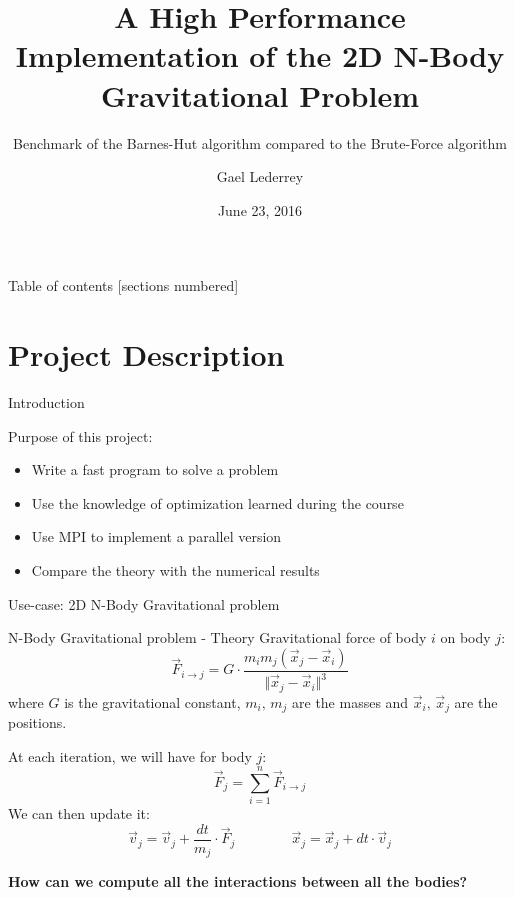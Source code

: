 \documentclass[10pt]{beamer}
\title{\vspace{1cm} A High Performance Implementation of the 2D N-Body Gravitational Problem}
\subtitle{Benchmark of the Barnes-Hut algorithm compared to the Brute-Force algorithm}
\date{June 23, 2016}
\author{Gael Lederrey}
\institute{Parallel and High-Performance Computing - Spring Semester 2016 \\ EPFL-CSE}
\begin{document}
\maketitle

\begin{frame}{Table of contents}
  [sections numbered]
  \tableofcontents[hideallsubsections]
\end{frame}

\section{Project Description}

\begin{frame}{Introduction}

Purpose of this project:
\begin{itemize}
\item Write a fast program to solve a problem
\item Use the knowledge of optimization learned during the course
\item Use MPI to implement a parallel version
\item Compare the theory with the numerical results
\end{itemize}
\vspace{0.5cm}
Use-case: 2D N-Body Gravitational problem

\end{frame}

\begin{frame}{N-Body Gravitational problem - Theory}
Gravitational force of body $i$ on body $j$:
\[
\vec{F}_{i\rightarrow j} = G\cdot\frac{m_im_j(\vec{x}_j-\vec{x}_i)}{\Vert \vec{x}_j-\vec{x}_i\Vert^3}
\]
where $G$ is the gravitational constant, $m_i,\,m_j$ are the masses and $\vec{x}_i,\,\vec{x}_j$ are the positions.

At each iteration, we will have for body $j$:
\[
\vec{F}_j = \sum_{i=1}^n \vec{F}_{i\rightarrow j}
\]
We can then update it:
\[
\vec{v}_j = \vec{v}_j + \dfrac{dt}{m_j}\cdot \vec{F}_j \qquad \qquad \vec{x}_j = \vec{x}_j + dt\cdot\vec{v}_j
\]

\begin{center}
{\bf  How can we compute all the interactions between all the bodies?}
\end{center}

\end{frame}
\end{document}
